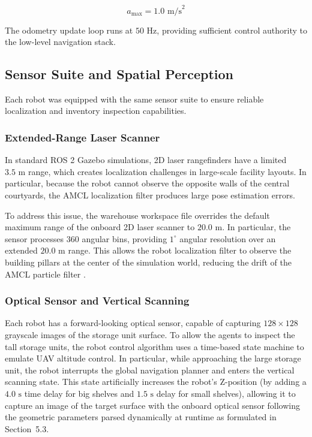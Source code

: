 \begin{equation}
a_{\text{max}} = 1.0\text{ m/s}^2
\end{equation}

The odometry update loop runs at $50\text{ Hz}$, providing sufficient control authority to the low-level navigation stack.

\subsection{Sensor Suite and Spatial Perception}

Each robot was equipped with the same sensor suite to ensure reliable localization and inventory inspection capabilities.

\subsubsection{Extended-Range Laser Scanner}

In standard ROS 2 Gazebo simulations, 2D laser rangefinders have a limited $3.5\text{ m}$ range, which creates localization challenges in large-scale facility layouts. In particular, because the robot cannot observe the opposite walls of the central courtyards, the AMCL localization filter produces large pose estimation errors.

To address this issue, the warehouse workspace file overrides the default maximum range of the onboard 2D laser scanner to $20.0\text{ m}$. In particular, the sensor processes $360$ angular bins, providing $1^\circ$ angular resolution over an extended $20.0\text{ m}$ range. This allows the robot localization filter to observe the building pillars at the center of the simulation world, reducing the drift of the AMCL particle filter \cite{wu2025analysis}.

\subsubsection{Optical Sensor and Vertical Scanning}

Each robot has a forward-looking optical sensor, capable of capturing $128 \times 128$ grayscale images of the storage unit surface. To allow the agents to inspect the tall storage units, the robot control algorithm uses a time-based state machine to emulate UAV altitude control. In particular, while approaching the large storage unit, the robot interrupts the global navigation planner and enters the vertical scanning state. This state artificially increases the robot's Z-position (by adding a $4.0\text{ s}$ time delay for big shelves and $1.5\text{ s}$ delay for small shelves), allowing it to capture an image of the target surface with the onboard optical sensor following the geometric parameters parsed dynamically at runtime as formulated in Section~5.3.

